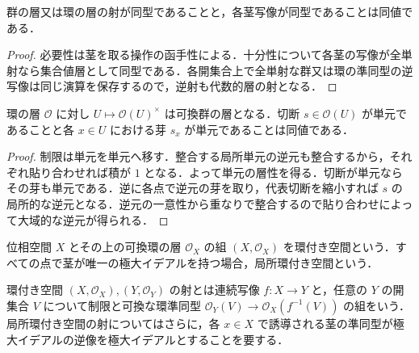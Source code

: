 \begin{prop}[茎による代数的層の同型判定]
群の層又は環の層の射が同型であることと，各茎写像が同型であることは同値である．
\end{prop}
\begin{proof}
必要性は茎を取る操作の函手性による．十分性について各茎の写像が全単射なら集合値層として同型である．各開集合上で全単射な群又は環の準同型の逆写像は同じ演算を保存するので，逆射も代数的層の射となる．
\end{proof}
\begin{prop}[単元の層]
環の層 $\mathcal O$ に対し $U\mapsto\mathcal O(U)^\times$ は可換群の層となる．切断 $s\in\mathcal O(U)$ が単元であることと各 $x\in U$ における芽 $s_x$ が単元であることは同値である．
\end{prop}
\begin{proof}
制限は単元を単元へ移す．整合する局所単元の逆元も整合するから，それぞれ貼り合わせれば積が $1$ となる．よって単元の層性を得る．切断が単元ならその芽も単元である．逆に各点で逆元の芽を取り，代表切断を縮小すれば $s$ の局所的な逆元となる．逆元の一意性から重なりで整合するので貼り合わせによって大域的な逆元が得られる．
\end{proof}
\begin{defn}[環付き空間]
位相空間 $X$ とその上の可換環の層 $\mathcal O_X$ の組 $(X,\mathcal O_X)$ を環付き空間という．すべての点で茎が唯一の極大イデアルを持つ場合，局所環付き空間という．
\end{defn}
\begin{defn}[環付き空間の射]
環付き空間 $(X,\mathcal O_X),(Y,\mathcal O_Y)$ の射とは連続写像 $f:X\to Y$ と，任意の $Y$ の開集合 $V$ について制限と可換な環準同型 $\mathcal O_Y(V)\to\mathcal O_X(f^{-1}(V))$ の組をいう．局所環付き空間の射についてはさらに，各 $x\in X$ で誘導される茎の準同型が極大イデアルの逆像を極大イデアルとすることを要する．
\end{defn}
